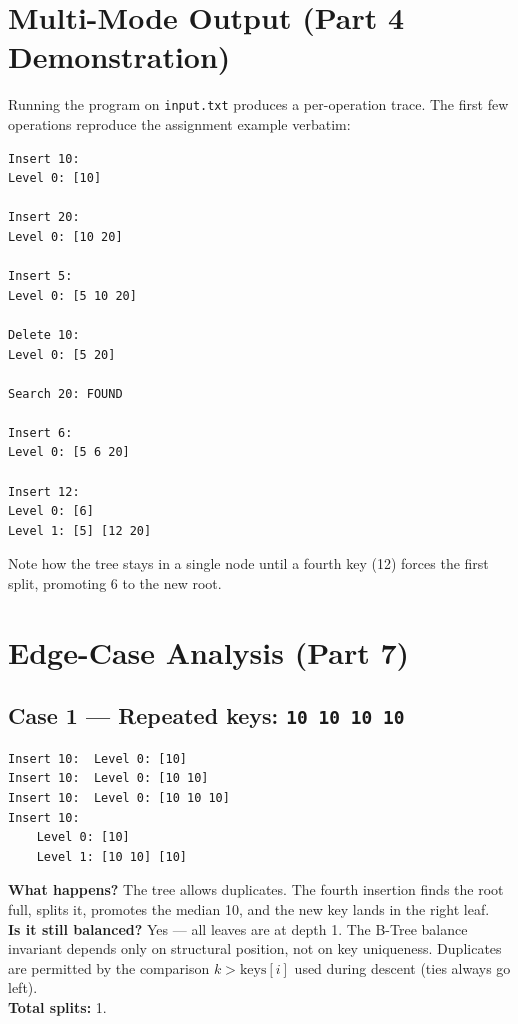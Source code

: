 \documentclass[11pt,a4paper]{article}
\begin{document}
\section{Multi-Mode Output (Part 4 Demonstration)}

Running the program on \texttt{input.txt} produces a per-operation trace. The first few operations reproduce the assignment example verbatim:

\begin{lstlisting}[style=plain]
Insert 10:
Level 0: [10]

Insert 20:
Level 0: [10 20]

Insert 5:
Level 0: [5 10 20]

Delete 10:
Level 0: [5 20]

Search 20: FOUND

Insert 6:
Level 0: [5 6 20]

Insert 12:
Level 0: [6]
Level 1: [5] [12 20]
\end{lstlisting}

\noindent Note how the tree stays in a single node until a fourth key (12) forces the first split, promoting 6 to the new root.

\section{Edge-Case Analysis (Part 7)}

\subsection*{Case 1 --- Repeated keys: \texttt{10\ 10\ 10\ 10}}

\begin{lstlisting}[style=plain]
Insert 10:  Level 0: [10]
Insert 10:  Level 0: [10 10]
Insert 10:  Level 0: [10 10 10]
Insert 10:
    Level 0: [10]
    Level 1: [10 10] [10]
\end{lstlisting}

\textbf{What happens?} The tree allows duplicates. The fourth insertion finds the root full, splits it, promotes the median 10, and the new key lands in the right leaf.\\[2pt]
\textbf{Is it still balanced?} Yes --- all leaves are at depth 1. The B-Tree balance invariant depends only on structural position, not on key uniqueness. Duplicates are permitted by the comparison $k > \mathrm{keys}[i]$ used during descent (ties always go left).\\[2pt]
\textbf{Total splits:} 1.
\end{document}

